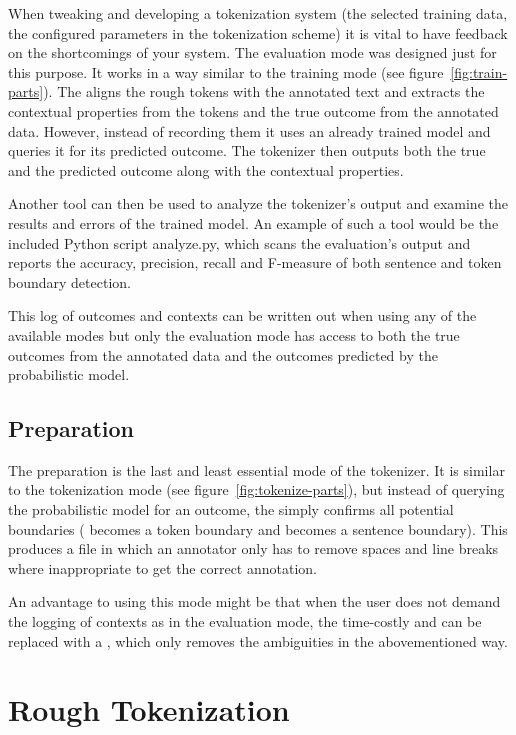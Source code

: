 When tweaking and developing a tokenization system (the selected training data,
the configured parameters in the tokenization scheme) it is vital to have
feedback on the shortcomings of your system. The evaluation mode was designed
just for this purpose. It works in a way similar to the training mode (see
figure~\ref{fig:train-parts}). The  aligns the rough tokens
with the annotated text and extracts the contextual properties from the tokens
and the true outcome from the annotated data. However, instead of recording
them it uses an already trained model and queries it for its predicted outcome.
The tokenizer then outputs both the true and the predicted outcome along with
the contextual properties.

Another tool can then be used to analyze the tokenizer's output and examine the
results and errors of the trained model. An example of such a tool would be the
included Python script analyze.py, which scans the evaluation's output and
reports the accuracy, precision, recall and F-measure of both sentence and
token boundary detection.

This log of outcomes and contexts can be written out when using any of the
available modes but only the evaluation mode has access to both the true
outcomes from the annotated data and the outcomes predicted by the
probabilistic model.

\subsection{Preparation}
\label{ssec:impl-modes-prepare}

The preparation is the last and least essential mode of the tokenizer. It is
similar to the tokenization mode (see figure~\ref{fig:tokenize-parts}), but
instead of querying the probabilistic model for an outcome, the
 simply confirms all potential boundaries (\maysplit{}
becomes a token boundary and \maybreaksentence{} becomes a sentence boundary).
This produces a file in which an annotator only has to remove spaces and line
breaks where inappropriate to get the correct annotation.

An advantage to using this mode might be that when the user does not demand the
logging of contexts as in the evaluation mode, the time-costly
 and  can be replaced with a
, which only removes the ambiguities in the
abovementioned way.

\section{Rough Tokenization}
\label{sec:impl-roughtok}

